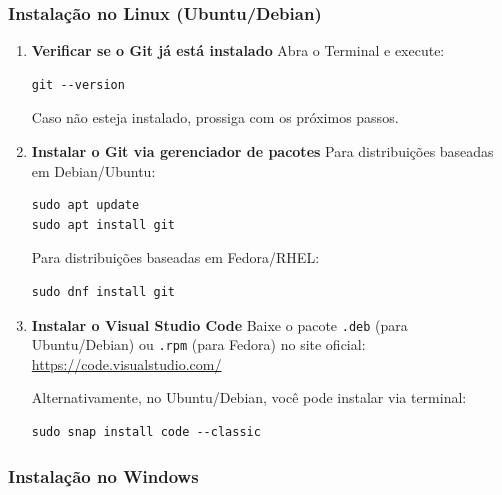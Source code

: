 \subsubsection*{Instalação no Linux (Ubuntu/Debian)}

\begin{enumerate}
    \item \textbf{Verificar se o Git já está instalado}  
    Abra o Terminal e execute:
    \begin{lstlisting}[style=shellstyle]
git --version
    \end{lstlisting}
    Caso não esteja instalado, prossiga com os próximos passos.

    \item \textbf{Instalar o Git via gerenciador de pacotes}  
    Para distribuições baseadas em Debian/Ubuntu:
    \begin{lstlisting}[style=shellstyle]
sudo apt update
sudo apt install git
    \end{lstlisting}
    Para distribuições baseadas em Fedora/RHEL:
    \begin{lstlisting}[style=shellstyle]
sudo dnf install git
    \end{lstlisting}

    \item \textbf{Instalar o Visual Studio Code}  
    Baixe o pacote \texttt{.deb} (para Ubuntu/Debian) ou \texttt{.rpm} (para Fedora) no site oficial:  
    \url{https://code.visualstudio.com/}  

    Alternativamente, no Ubuntu/Debian, você pode instalar via terminal:
    \begin{lstlisting}[style=shellstyle]
sudo snap install code --classic
    \end{lstlisting}
\end{enumerate}

\subsubsection*{Instalação no Windows}

